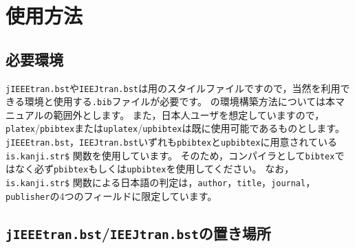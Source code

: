 \documentclass[10pt, a4paper, dvipdfmx, uplatex]{jsarticle} %
\renewcommand{\refname}{\small 参考文献}
\begin{document}
\begin{bibunit}[IEEJtran]
  \nocite{Incollection,jpIncollection1,jpIncollection2,enIncollection1}
  \renewcommand{\refname}{\small 参考文献(IEEJtran.bst)}
  {\small \putbib[./incollection]}
\end{bibunit}
\begin{bibunit}[jIEEEtran]
  \nocite{Incollection,jpIncollection1,jpIncollection2,enIncollection1}
  \renewcommand{\refname}{\small 参考文献(jIEEEtran.bst)}
  {\small \putbib[./incollection]}
\end{bibunit}
\begin{bibunit}[IEEJtran]
  \nocite{enIncollection1/ej/jpIncollection1}
  \renewcommand{\refname}{\small 英日を併記した参考文献(IEEJtran.bst)}
  {\small \putbib[./incollection]}
\end{bibunit}
\begin{bibunit}[jIEEEtran]
  \nocite{enIncollection1/ej/jpIncollection1}
  \renewcommand{\refname}{\small 英日を併記した参考文献(jIEEEtran.bst)}
  {\small \putbib[./incollection]}
\end{bibunit}




\section{使用方法}

\subsection{必要環境}

\texttt{jIEEEtran.bst}や\texttt{IEEJtran.bst}は\BibTeX 用のスタイルファイルですので，当然\BibTeX を利用できる環境と使用する\texttt{.bib}ファイルが必要です。
\BibTeX の環境構築方法については本マニュアルの範囲外とします。
また，日本人ユーザを想定していますので，\texttt{platex}/\texttt{pbibtex}または\texttt{uplatex}/\texttt{upbibtex}は既に使用可能であるものとします。
\texttt{jIEEEtran.bst}，\texttt{IEEJtran.bst}いずれも\texttt{pbibtex}と\texttt{upbibtex}に用意されている\texttt{is.kanji.str\$} 関数を使用しています。
そのため，\BibTeX コンパイラとして\texttt{bibtex}ではなく必ず\texttt{pbibtex}もしくは\texttt{upbibtex}を使用してください。
なお，\texttt{is.kanji.str\$} 関数による日本語の判定は，\texttt{author}，\texttt{title}，\texttt{journal}，\texttt{publisher}の4つのフィールドに限定しています。



\subsection{\texttt{jIEEEtran.bst}/\texttt{IEEJtran.bst}の置き場所}
\end{document}

